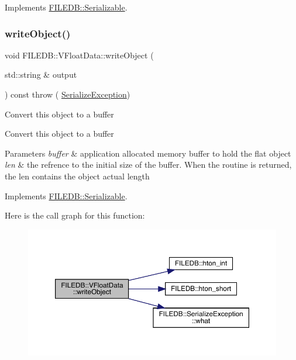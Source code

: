 Implements \mbox{\hyperlink{classFILEDB_1_1Serializable_a5d639b5dbd5d8ebc7dca1eca31bbc868}{F\+I\+L\+E\+D\+B\+::\+Serializable}}.

\mbox{\label{classFILEDB_1_1VFloatData_afad9c7e520cdd7bf9ae0b477b8a5f1f1}} 
\subsubsection{\texorpdfstring{writeObject()}{writeObject()}}
{\footnotesize\ttfamily void F\+I\+L\+E\+D\+B\+::\+V\+Float\+Data\+::write\+Object (\begin{DoxyParamCaption}\item[{std\+::string \&}]{output }\end{DoxyParamCaption}) const throw ( \mbox{\hyperlink{classFILEDB_1_1SerializeException}{Serialize\+Exception}}) \hspace{0.3cm}{\ttfamily [virtual]}}

Convert this object to a buffer

Convert this object to a buffer


\begin{DoxyParams}{Parameters}
{\em buffer} & application allocated memory buffer to hold the flat object \\
\hline
{\em len} & the refrence to the initial size of the buffer. When the routine is returned, the len contains the object actual length \\
\hline
\end{DoxyParams}


Implements \mbox{\hyperlink{classFILEDB_1_1Serializable_a8deaa86e108c08c863881e46cf5578ea}{F\+I\+L\+E\+D\+B\+::\+Serializable}}.

Here is the call graph for this function\+:\nopagebreak
\begin{figure}[H]
\begin{center}
\leavevmode
\includegraphics[width=350pt]{d3/d37/classFILEDB_1_1VFloatData_afad9c7e520cdd7bf9ae0b477b8a5f1f1_cgraph}
\end{center}
\end{figure}


